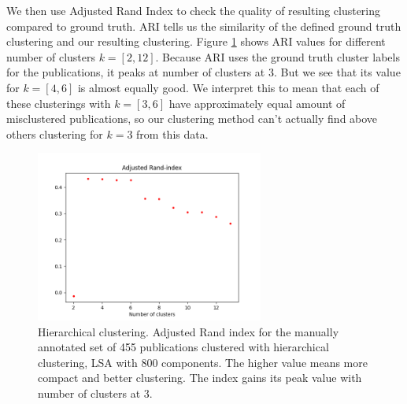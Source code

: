 We then use Adjusted Rand Index to check the quality of resulting 
clustering compared to ground truth. ARI tells us the similarity 
of the defined ground truth clustering and our resulting clustering. 
Figure \ref{fig:ari01} shows ARI values for different number of 
clusters $k=[2,12]$. Because ARI uses the ground truth cluster 
labels for the publications, it peaks at number of clusters at 
$3$. But we see that its value for $k=[4,6]$ is almost equally 
good. We interpret this to mean that each of these clusterings 
with $k=[3,6]$ have approximately equal amount of misclustered 
publications, so our clustering method can't actually find above 
others clustering for $k=3$ from this data.
\begin{figure}[htp]
  \begin{center}    
\includegraphics[width=7.5cm]{images/ari-plot-455-2_12-800-hierarchical.png}
    \caption{Hierarchical clustering. Adjusted Rand index for the
    manually annotated set of 455 publications clustered with
    hierarchical clustering, LSA with 800 components. The higher 
    value means more compact and better clustering. The index 
    gains its peak value with number of clusters at $3$.}
    \label{fig:ari01}
  \end{center}
\end{figure}

